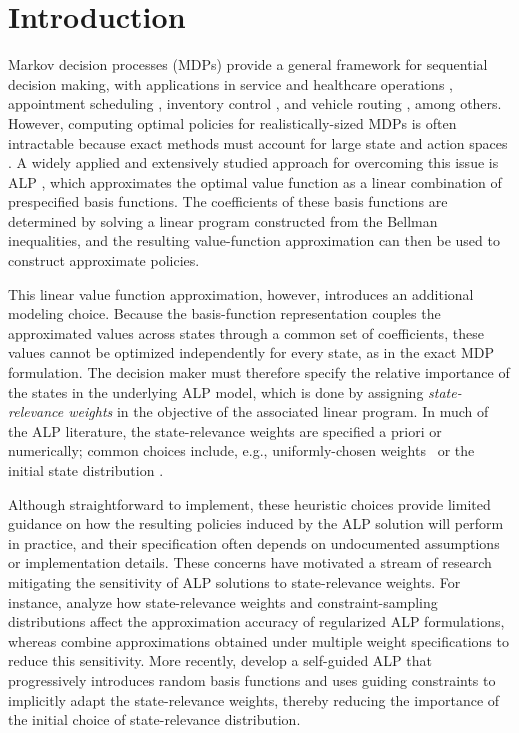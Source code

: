 \documentclass[sglanonrev]{informs4}
\def\edits#1{{\color{black}#1}}
\begin{document}
\section{Introduction}
\label{sec:introduction}

Markov decision processes (MDPs) provide a general framework for sequential decision making, with applications in service and healthcare operations  \citep{maxwell2010approximate, dong2025multiclass}, appointment scheduling \citep{patrick2008dynamic,saure2012dynamic,diamant2021dynamic}, inventory control \citep{abouee2026platelet,lin2020revisiting}, and vehicle routing \citep{secomandi2009reoptimization}, among others. However, computing optimal policies for realistically-sized MDPs is often intractable because exact methods must account for large state and action spaces \citep{puterman2014markov}. A widely applied and extensively studied approach \edits{for overcoming this issue is} \ac{ALP} \citep{schweitzer1985generalized,de2003linear}, which approximates the optimal value function as a linear combination of prespecified basis functions. The coefficients of these basis functions are determined by solving a linear program constructed from the Bellman inequalities, and the resulting value-function approximation can then be used to construct approximate policies.

This linear \edits{value function} approximation, however, introduces an additional modeling choice. Because the basis-function representation couples the approximated values across states through a common set of coefficients, these values cannot be optimized independently for every state, as in the exact MDP formulation. The decision maker must therefore specify the relative importance of the states in the underlying \ac{ALP} model, which is done by assigning \textit{state-relevance weights} in the objective of the associated linear program. In much of the \ac{ALP} literature, the state-relevance weights are specified a priori or numerically; common choices include, e.g., uniformly-chosen weights~\citep{le2004choose} or the initial state distribution \citep{saure2012dynamic}.

Although straightforward to implement, these heuristic choices provide limited guidance on how the resulting policies \edits{induced by the \ac{ALP} solution} will perform in practice, and their specification often depends on undocumented assumptions or implementation details. These concerns have motivated a stream of research mitigating the sensitivity of \ac{ALP} solutions to state-relevance weights. For instance, \citet{taylor2014analysis} analyze how state-relevance weights and constraint-sampling distributions affect the approximation accuracy of regularized \ac{ALP} formulations, whereas \citet{beuchat2016alleviating} combine approximations obtained under multiple weight specifications to reduce this sensitivity. \edits{More recently, \citet{pakiman2025self} develop a self-guided \ac{ALP} that progressively introduces random basis functions and uses guiding constraints to implicitly adapt the state-relevance weights, thereby reducing the importance of the initial choice of state-relevance distribution.}
\end{document}
